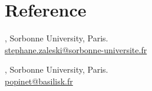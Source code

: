 \documentclass[]{deedy-resume-openfont}
\begin{document}
\begin{minipage}[t]{0.49\textwidth}
\section{Reference}
\sectionsep
\begin{tightemize}
\item {}, Sorbonne University, Paris. \\ \href{mailto:stephane.zaleski@sorbonne-universite.fr}{stephane.zaleski@sorbonne-universite.fr}
\item {}, Sorbonne University, Paris. \\ \href{mailto:popinet@basilisk.fr}{popinet@basilisk.fr}
\end{tightemize}

\end{minipage} 
\end{document}
